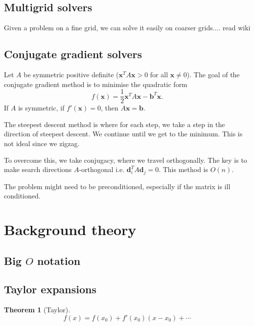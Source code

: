 \documentclass[11pt, a4paper]{article}
\theoremstyle{break}
\newtheorem{thm}{Theorem}[section]
\newcommand{\ve}{\mathbf} %
\begin{document}
\subsection{Multigrid solvers}
Given a problem on a fine grid, we can solve it easily on coarser grids.... read wiki

\subsection{Conjugate gradient solvers}
Let $A$ be symmetric positive definite ($\ve x^TA\ve x>0$ for all $\ve x\neq0$). The goal of the conjugate gradient method is to minimise the quadratic form \[f(\ve x)=\frac12 \ve x^T A \ve x- \ve b^T \ve x .\] If $A$ is symmetric, if $f'(\ve x)=0$, then $A\ve x=\ve b$.

The steepest descent method is where for each step, we take a step in the direction of steepest descent. We continue until we get to the minimum. This is not ideal since we zigzag.

To overcome this, we take conjugacy, where we travel orthogonally. The key is to make search directions $A$-orthogonal i.e. $\ve d_i^T A\ve d_j = 0$. This method is $O(n)$.

The problem might need to be preconditioned, especially if the matrix is ill conditioned.

\appendix
\section{Background theory}
\subsection{\texorpdfstring{Big $O$}{Big O} notation}\label{sec:bigO}
\subsection{Taylor expansions}\label{sec:taylor}
\begin{thm}[Taylor]\label{thm:taylor}
	\[f(x)=f(x_0)+f'(x_0)(x-x_0) + \cdots\]
\end{thm}

\nocite{*}



\label{lastpage}
\end{document}
